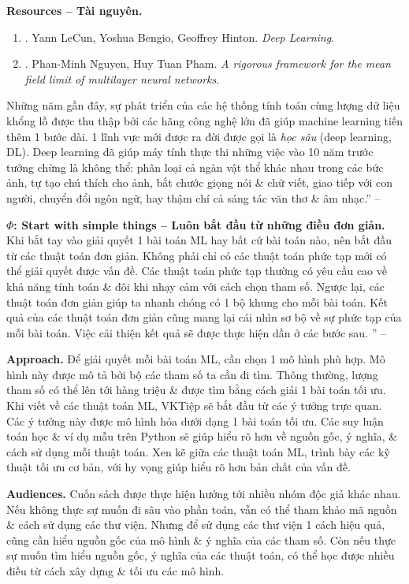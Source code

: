 \documentclass{article}
\begin{document}
\noindent\textbf{\textsf{Resources -- Tài nguyên.}}
\begin{enumerate}
	\item \cite{LeCun_Bengio_Hinton2015}. {\sc Yann LeCun, Yoshua Bengio, Geoffrey Hinton}. {\it Deep Learning}.
	\item \cite{Nguyen_Pham2023}. {\sc Phan-Minh Nguyen, Huy Tuan Pham}. {\it A rigorous framework for the mean field limit of multilayer neural networks}.
\end{enumerate}
Những năm gần đây, sự phát triển của các hệ thống tính toán cùng lượng dữ liệu khổng lồ được thu thập bởi các hãng công nghệ lớn đã giúp machine learning tiến thêm 1 bước dài. 1 lĩnh vực mới được ra đời được gọi là {\it học sâu} (deep learning, DL). Deep learning đã giúp máy tính thực thi những việc vào 10 năm trước tưởng chừng là không thể: phân loại cả ngàn vật thể khác nhau trong các bức ảnh, tự tạo chú thích cho ảnh, bắt chước giọng nói \& chữ viết, giao tiếp với con người, chuyển đổi ngôn ngữ, hay thậm chí cả sáng tác văn thơ \& âm nhạc.'' -- \cite[p. 15]{Tiep_ML_co_ban}

{\bf$\Phi$: Start with simple things -- Luôn bắt đầu từ những điều đơn giản.} Khi bắt tay vào giải quyết 1 bài toán ML hay bất cứ bài toán nào, nên bắt đầu từ các thuật toán đơn giản. Không phải chỉ có các thuật toán phức tạp mới có thể giải quyết được vấn đề. Các thuật toán phức tạp thường có yêu cầu cao về khả năng tính toán \& đôi khi nhạy cảm với cách chọn tham số. Ngược lại, các thuật toán đơn giản giúp ta nhanh chóng có 1 bộ khung cho mỗi bài toán. Kết quả của các thuật toán đơn giản cũng mang lại cái nhìn sơ bộ về sự phức tạp của mỗi bài toán. Việc cải thiện kết quả sẽ được thực hiện dần ở các bước sau. '' -- \cite[p. 17]{Tiep_ML_co_ban}

{\bf Approach.} Để giải quyết mỗi bài toán ML, cần chọn 1 mô hình phù hợp. Mô hình này được mô tả bởi bộ các tham số ta cần đi tìm. Thông thường, lượng tham số có thể lên tới hàng triệu \& được tìm bằng cách giải 1 bài toán tối ưu. Khi viết về các thuật toán ML, VKTiệp sẽ bắt đầu từ các ý tưởng trực quan. Các ý tưởng này được mô hình hóa dưới dạng 1 bài toán tối ưu. Các suy luận toán học \& ví dụ mẫu trên Python sẽ giúp hiểu rõ hơn về nguồn gốc, ý nghĩa, \& cách sử dụng mỗi thuật toán. Xen kẽ giữa các thuật toán ML, trình bày các kỹ thuật tối ưu cơ bản, với hy vọng giúp hiểu rõ hơn bản chất của vấn đề.

{\bf Audiences.} Cuốn sách được thực hiện hướng tới nhiều nhóm độc giả khác nhau. Nếu không thực sự muốn đi sâu vào phần toán, vẫn có thể tham khảo mã nguồn \& cách sử dụng các thư viện. Nhưng để sử dụng các thư viện 1 cách hiệu quả, cũng cần hiểu nguồn gốc của mô hình \& ý nghĩa của các tham số. Còn nếu thực sự muốn tìm hiểu nguồn gốc, ý nghĩa của các thuật toán, có thể học được nhiều điều từ cách xây dựng \& tối ưu các mô hình.
\end{document}
